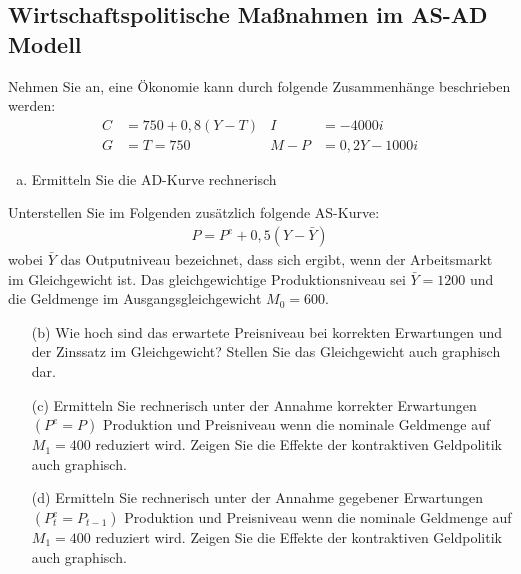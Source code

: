 \documentclass{scrartcl}
\begin{document}
\subsection{Wirtschaftspolitische Ma{\ss}nahmen im AS-AD Modell}
Nehmen Sie an, eine \"{O}konomie kann durch folgende Zusammenh\"{a}nge beschrieben werden:
\begin{align*}
  C &= 750 + 0,8(Y-T)  &
  I &= -4000 i\\
  G&=T=750 &
  M-P &= 0,2 Y -1000i
\end{align*}
\begin{enumerate}[(a)]
\item Ermitteln Sie die AD-Kurve rechnerisch
\end{enumerate}
Unterstellen Sie im Folgenden zus\"{a}tzlich folgende AS-Kurve:
\begin{align*}
  P = P^e + 0,5(Y-\bar{Y})
\end{align*}
wobei $\bar{Y}$ das Outputniveau bezeichnet, dass sich ergibt, wenn der Arbeitsmarkt im Gleichgewicht ist. Das gleichgewichtige Produktionsniveau sei $\bar{Y}=1200$ und die Geldmenge im Ausgangsgleichgewicht $M_0=600$.
\begin{enumerate}
  \item[(b)] Wie hoch sind das erwartete Preisniveau bei korrekten Erwartungen und der Zinssatz im Gleichgewicht? Stellen Sie das Gleichgewicht auch graphisch dar.
  \item[(c)] Ermitteln Sie rechnerisch unter der Annahme korrekter Erwartungen $(P^e=P)$ Produktion und Preisniveau wenn die nominale Geldmenge auf $M_1 =400$ reduziert wird. Zeigen Sie die Effekte der kontraktiven Geldpolitik auch graphisch.
  \item[(d)] Ermitteln Sie rechnerisch unter der Annahme gegebener Erwartungen $(P_t^e=P_{t-1})$ Produktion und Preisniveau wenn die nominale Geldmenge auf $M_1 =400$ reduziert wird. Zeigen Sie die Effekte der kontraktiven Geldpolitik auch graphisch.
\end{enumerate}
\end{document}
